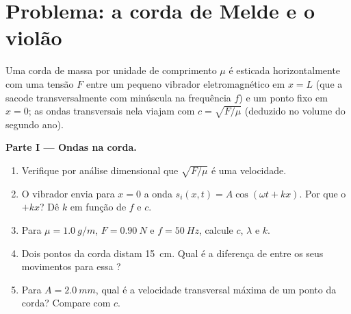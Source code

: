 \section{Problema: a corda de Melde e o violão}

\begin{problem}
\label{pb:b1:wave-propagation:1}
Uma corda de massa por unidade de comprimento $\mu$ é esticada horizontalmente com uma
tensão $F$ entre um pequeno vibrador eletromagnético em $x = L$ (que
a sacode transversalmente com  minúscula na frequência $f$) e um
ponto fixo em $x = 0$; as ondas transversais nela viajam com
$c = \sqrt{F/\mu}$ (deduzido no volume do segundo ano).

\medskip
\noindent\textbf{Parte I --- Ondas na corda.}
\begin{enumerate}
  \item Verifique por análise dimensional que $\sqrt{F/\mu}$ é uma velocidade.
  \item O vibrador envia para $x = 0$ a onda
        $s_i(x, t) = A\cos(\omega t + kx)$. Por que o  $+kx$? Dê $k$
        em função de $f$ e $c$.
  \item Para $\mu = \qty{1.0}{g/m}$, $F = \qty{0.90}{N}$ e
        $f = \qty{50}{Hz}$, calcule $c$, $\lambda$ e $k$.
  \item Dois pontos da corda distam \qty{15}{cm}. Qual é a
        diferença de  entre os seus movimentos para essa ?
  \item Para $A = \qty{2.0}{mm}$, qual é a velocidade transversal
        máxima de um ponto da corda? Compare com $c$.
\end{enumerate}


\end{problem}

